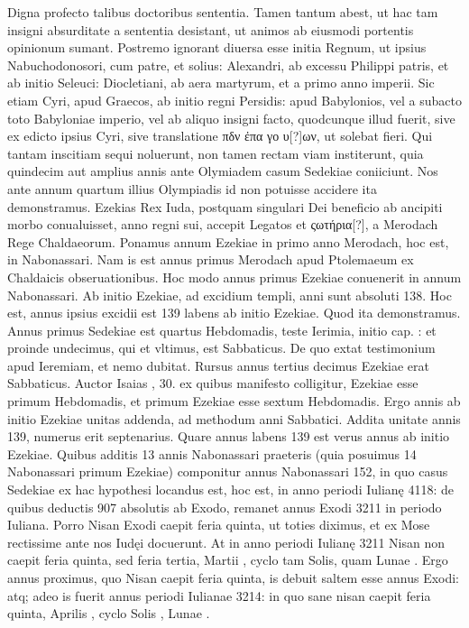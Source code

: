 Digna profecto
talibus doctoribus sententia.
Tamen tantum abest, ut hac tam insigni
absurditate a sententia desistant, ut animos ab eiusmodi portentis
opinionum sumant.
Postremo ignorant diuersa esse initia Regnum,
ut ipsius Nabuchodonosori, cum patre, et solius: Alexandri,
ab excessu Philippi patris, et ab initio Seleuci: Diocletiani, ab aera
martyrum, et a primo anno imperii.
Sic etiam Cyri, apud Graecos, ab
initio regni Persidis: apud Babylonios, vel a subacto toto Babyloniae
imperio, vel ab aliquo insigni facto, quodcunque illud fuerit, sive
ex edicto ipsius Cyri, sive translatione \textgreek{πδν ἐπα γο υ[?]ων},
ut solebat fieri.
Qui tantam inscitiam sequi noluerunt, non tamen rectam viam
institerunt, quia quindecim aut amplius annis ante  Olymiadem
casum Sedekiae coniiciunt.
Nos ante annum quartum illius
Olympiadis id non potuisse accidere ita demonstramus. 
Ezekias
Rex Iuda, postquam singulari Dei beneficio ab ancipiti morbo conualuisset,
anno  regni sui, accepit Legatos et \textgreek{ςωτήρια[?]}, a
Merodach Rege Chaldaeorum.
Ponamus  annum Ezekiae in
primo anno Merodach, hoc est, in  Nabonassari.
Nam is est
annus primus Merodach apud Ptolemaeum ex Chaldaicis obseruationibus. 
Hoc modo annus primus Ezekiae conuenerit in annum
 Nabonassari.
Ab initio Ezekiae, ad excidium templi, anni
sunt absoluti 138.
Hoc est, annus ipsius excidii est 139 labens ab initio
Ezekiae.
Quod ita demonstramus. 
Annus primus Sedekiae est
quartus Hebdomadis, teste Ierimia, initio cap. : et proinde
undecimus, qui et vltimus, est Sabbaticus. 
De quo extat testimonium
apud Ieremiam, et nemo dubitat.
Rursus annus tertius decimus
Ezekiae erat Sabbaticus. 
Auctor Isaias , 30.
 ex quibus
manifesto colligitur,  Ezekiae esse primum Hebdomadis, et primum
Ezekiae esse sextum Hebdomadis. 
Ergo annis ab initio Ezekiae unitas addenda, ad methodum anni Sabbatici.
Addita unitate annis
139, numerus erit septenarius. 
Quare annus labens 139 est verus
annus ab initio Ezekiae.
Quibus additis 13 annis Nabonassari praeteris
(quia posuimus 14 Nabonassari primum Ezekiae) componitur
annus Nabonassari 152, in quo casus Sedekiae ex hac hypothesi
locandus est, hoc est, in anno periodi Iulianę 4118: de quibus deductis
907 absolutis ab Exodo, remanet annus Exodi 3211 in periodo Iuliana.
Porro Nisan Exodi caepit feria quinta, ut toties diximus, et ex
Mose rectissime ante nos Iudęi docuerunt.
At in anno periodi Iulianę
3211 Nisan non caepit feria quinta, sed feria tertia,
 Martii , cyclo tam
Solis, quam Lunae .
Ergo annus proximus, quo Nisan caepit feria
quinta, is debuit saltem esse annus Exodi: atq; adeo is fuerit annus periodi
Iulianae 3214: in quo sane nisan caepit feria quinta, Aprilis ,
cyclo Solis , Lunae .

